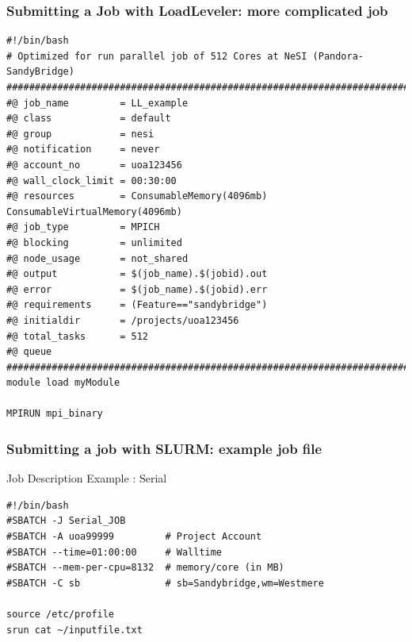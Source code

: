 \documentclass{beamer}
\begin{document}
\begin{frame}
  \frametitle{Submitting a Job with LoadLeveler: more complicated job}
\begin{verbatim}
#!/bin/bash
# Optimized for run parallel job of 512 Cores at NeSI (Pandora-SandyBridge)
##########################################################################
#@ job_name         = LL_example
#@ class            = default
#@ group            = nesi
#@ notification     = never
#@ account_no       = uoa123456
#@ wall_clock_limit = 00:30:00
#@ resources        = ConsumableMemory(4096mb) ConsumableVirtualMemory(4096mb)
#@ job_type         = MPICH
#@ blocking         = unlimited
#@ node_usage       = not_shared
#@ output           = $(job_name).$(jobid).out
#@ error            = $(job_name).$(jobid).err
#@ requirements     = (Feature=="sandybridge")
#@ initialdir       = /projects/uoa123456
#@ total_tasks      = 512
#@ queue
##########################################################################
module load myModule

MPIRUN mpi_binary

\end{verbatim}
\end{frame}




\begin{frame}
  \frametitle{Submitting a job with SLURM: example job file}
\begin{block}{Job Description Example : Serial}
\begin{scriptsize}
\begin{verbatim}
#!/bin/bash
#SBATCH -J Serial_JOB
#SBATCH -A uoa99999         # Project Account
#SBATCH --time=01:00:00     # Walltime
#SBATCH --mem-per-cpu=8132  # memory/core (in MB)
#SBATCH -C sb               # sb=Sandybridge,wm=Westmere

source /etc/profile
srun cat ~/inputfile.txt
\end{verbatim}
\end{scriptsize}
  \end{block}
\end{frame}
\end{document}
